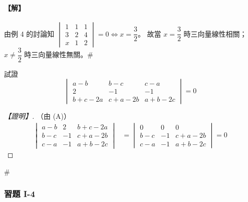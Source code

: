 \paragraph{【解】}
由例 4 的討論知 $\begin{vmatrix} 1 & 1 & 1 \\ 3 & 2 & 4 \\ x & 1 & 2 \end{vmatrix} = 0 \iff x = \dfrac{3}{2}$。
故當 $x = \dfrac{3}{2}$ 時三向量線性相關；$x \ne \dfrac{3}{2}$ 時三向量線性無關。\hfill$\#$

\begin{example}\label{ex:b6-1-21}
試證
\[ \begin{vmatrix}
a-b & b-c & c-a \\
2 & -1 & -1 \\
b+c-2a & c+a-2b & a+b-2c
\end{vmatrix} = 0 \]
\end{example}

\begin{proof}[【證明】]
（由 (A)）
\begin{align*}
\begin{vmatrix}
a-b & 2 & b+c-2a \\
b-c & -1 & c+a-2b \\
c-a & -1 & a+b-2c
\end{vmatrix}
&= \begin{vmatrix}
0 & 0 & 0 \\
b-c & -1 & c+a-2b \\
c-a & -1 & a+b-2c
\end{vmatrix} = 0
\end{align*}
\end{proof}\hfill$\#$

\subsubsection*{習題 I-4}\label{sec:b6-ex1-4}

